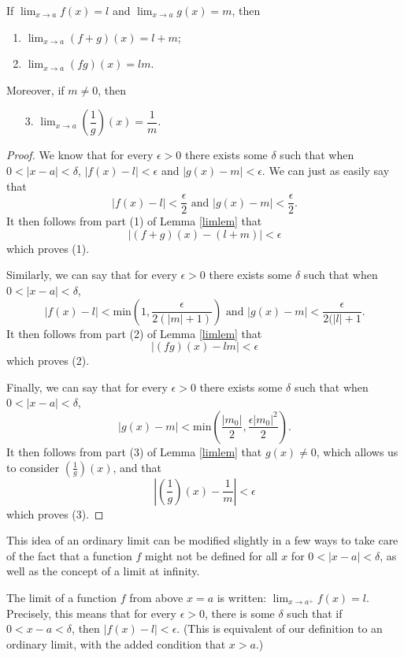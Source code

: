 \begin{theorem} \label{limthm}
If $\lim_{x \to a} f(x) = l$ and $\lim_{x \to a} g(x) = m$, then
\begin{enumerate}
\item
$\lim_{x \to a} (f + g)(x) = l + m$;
\item
$\lim_{x \to a} (fg)(x) = lm$.
\end{enumerate}
Moreover, if $m \ne 0$, then
\begin{enumerate}
\item[3.]
$\lim_{x \to a} \left(\dfrac{1}{g}\right) (x) = \dfrac{1}{m}$.
\end{enumerate}
\begin{proof}
We know that for every $\epsilon > 0$ there exists some $\delta$ such that when $0 < |x - a| < \delta$, $|f(x) - l| < \epsilon$ and $|g(x) - m| < \epsilon$. We can just as easily say that
\[ |f(x) - l| < \frac{\epsilon}{2} \textrm{ and } |g(x) - m| < \frac{\epsilon}{2}. \]
It then follows from part (1) of Lemma \ref{limlem} that
\[ |(f + g)(x) - (l + m)| < \epsilon \]
which proves (1).

Similarly, we can say that for every $\epsilon > 0$ there exists some $\delta$ such that when $0 < |x - a| < \delta$,
\[ |f(x) - l| < \textrm{min}\left(1, \frac{\epsilon}{2(|m| + 1)}\right) \textrm{ and } |g(x) - m| < \frac{\epsilon}{2(|l| + 1}. \]
It then follows from part (2) of Lemma \ref{limlem} that
\[ |(fg)(x) - lm| < \epsilon \]
which proves (2).

Finally, we can say that for every $\epsilon > 0$ there exists some $\delta$ such that when $0 < |x - a| < \delta$,
\[ |g(x) - m| < \textrm{min}\left(\frac{|m_0|}{2}, \frac{\epsilon|m_0|^2}{2}\right). \]
It then follows from part (3) of Lemma \ref{limlem} that $g(x) \ne 0$, which allows us to consider $\left(\frac{1}{g}\right)(x)$, and that
\[ \left|\left(\frac{1}{g}\right) (x) - \frac{1}{m}\right| < \epsilon \]
which proves (3).
\end{proof} 
\end{theorem}

This idea of an ordinary limit can be modified slightly in a few ways to take care of the fact that a function $f$ might not be defined for all $x$ for $0 < |x - a| < \delta$, as well as the concept of a limit at infinity.

\begin{definition}
The limit of a function $f$ from above $x = a$ is written: $\lim_{x \to a^+} f(x) = l$. Precisely, this means that for every $\epsilon > 0$, there is some $\delta$ such that if $0 < x - a < \delta$, then $|f(x) - l| < \epsilon$. (This is equivalent of our definition to an ordinary limit, with the added condition that $x > a$.)
\end{definition}


